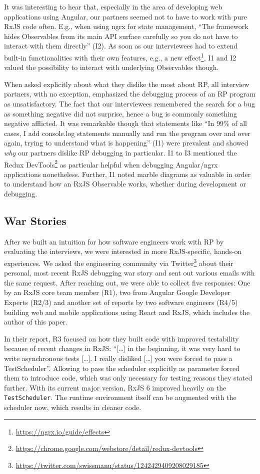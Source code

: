 \documentclass[sigplan,screen,review]{acmart}
\begin{document}
It was interesting to hear that, especially in the area of developing web applications using Angular, our partners seemed not to have to work with pure RxJS code often. E.g., when using ngrx for state management, ``The framework hides Observables from its main API surface carefully so you do not have to interact with them directly'' (I2). As soon as our interviewees had to extend built-in functionalities with their own features, e.g., a new effect\footnote{\url{https://ngrx.io/guide/effects}}, I1 and I2 valued the possibility to interact with underlying Observables though.

When asked explicitly about what they dislike the most about RP, all interview partners, with no exception, emphasized the debugging process of an RP program as unsatisfactory. The fact that our interviewees remembered the search for a bug as something negative did not surprise, hence a bug is commonly something negative afflicted. It was remarkable though that statements like ``In 99\% of all cases, I add console.log statements manually and run the program over and over again, trying to understand what is happening'' (I1) were prevalent and showed \emph{why} our partners dislike RP debugging in particular. I1 to I3 mentioned the Redux DevTools\footnote{\url{https://chrome.google.com/webstore/detail/redux-devtools}} as particular helpful when debugging Angular/ngrx applications nonetheless. Further, I1 noted marble diagrams as valuable in order to understand how an RxJS Observable works, whether during development or debugging.

\subsection{War Stories}

After we built an intuition for how software engineers work with RP by evaluating the interviews, we were interested in more RxJS-specific, hands-on experiences. We asked the engineering community via Twitter\footnote{\url{https://twitter.com/swissmanu/status/1242429409208029185}} about their personal, most recent RxJS debugging war story and sent out various emails with the same request. After reaching out, we were able to collect five responses: One by an RxJS core team member (R1), two from Angular Google Developer Experts (R2/3) and another set of reports by two software engineers (R4/5) building web and mobile applications using React and RxJS, which includes the author of this paper.

In their report, R3 focused on how they built code with improved testability because of recent changes in RxJS: ``[\dots] in the beginning, it was very hard to write asynchronous tests [\dots]. I really disliked [\dots] you were forced to pass a TestScheduler''. Allowing to pass the scheduler explicitly as parameter forced them to introduce code, which was only necessary for testing reasons they stated further. With its current major version, RxJS 6 improved heavily on the  \texttt{TestScheduler}. The runtime environment itself can be augmented with the scheduler now, which results in cleaner code.
\end{document}
